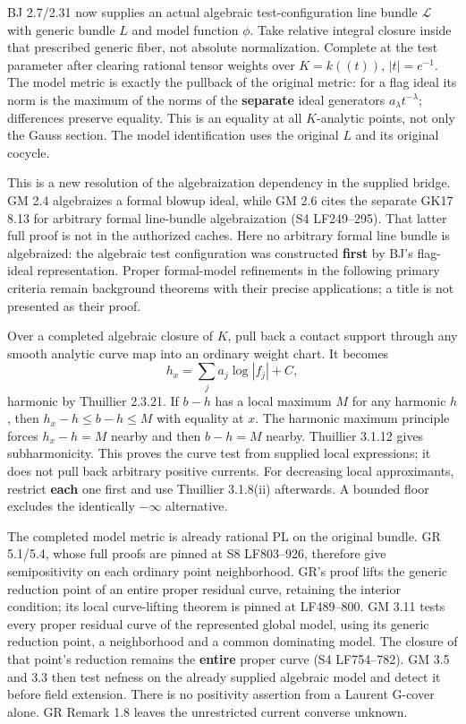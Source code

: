 \documentclass[
  10pt,
]{article}
\begin{document}
BJ 2.7/2.31 now supplies an actual algebraic test-configuration line
bundle \(\mathcal L\) with generic bundle \(L\) and model function
\(\phi\). Take relative integral closure inside that prescribed generic
fiber, not absolute normalization. Complete at the test parameter after
clearing rational tensor weights over \(K=k((t))\), \(|t|=e^{-1}\). The
model metric is exactly the pullback of the original metric: for a flag
ideal its norm is the maximum of the norms of the \textbf{separate}
ideal generators \(a_\lambda t^{-\lambda}\); differences preserve
equality. This is an equality at all \(K\)-analytic points, not only the
Gauss section. The model identification uses the original \(L\) and its
original cocycle.

This is a new resolution of the algebraization dependency in the
supplied bridge. GM 2.4 algebraizes a formal blowup ideal, while GM 2.6
cites the separate GK17 8.13 for arbitrary formal line-bundle
algebraization (S4 LF249--295). That latter full proof is not in the
authorized caches. Here no arbitrary formal line bundle is algebraized:
the algebraic test configuration was constructed \textbf{first} by BJ's
flag-ideal representation. Proper formal-model refinements in the
following primary criteria remain background theorems with their precise
applications; a title is not presented as their proof.

Over a completed algebraic closure of \(K\), pull back a contact support
through any smooth analytic curve map into an ordinary weight chart. It
becomes \[h_x=\sum_j a_j\log|f_j|+C,\] harmonic by Thuillier 2.3.21. If
\(b-h\) has a local maximum \(M\) for any harmonic \(h\), then
\(h_x-h\le b-h\le M\) with equality at \(x\). The harmonic maximum
principle forces \(h_x-h=M\) nearby and then \(b-h=M\) nearby. Thuillier
3.1.12 gives subharmonicity. This proves the curve test from supplied
local expressions; it does not pull back arbitrary positive currents.
For decreasing local approximants, restrict \textbf{each} one first and
use Thuillier 3.1.8(ii) afterwards. A bounded floor excludes the
identically \(-\infty\) alternative.

The completed model metric is already rational PL on the original
bundle. GR 5.1/5.4, whose full proofs are pinned at S8 LF803--926,
therefore give semipositivity on each ordinary point neighborhood. GR's
proof lifts the generic reduction point of an entire proper residual
curve, retaining the interior condition; its local curve-lifting theorem
is pinned at LF489--800. GM 3.11 tests every proper residual curve of
the represented global model, using its generic reduction point, a
neighborhood and a common dominating model. The closure of that point's
reduction remains the \textbf{entire} proper curve (S4 LF754--782). GM
3.5 and 3.3 then test nefness on the already supplied algebraic model
and detect it before field extension. There is no positivity assertion
from a Laurent G-cover alone. GR Remark 1.8 leaves the unrestricted
current converse unknown.
\end{document}
